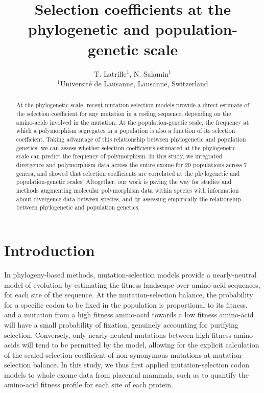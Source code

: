 \documentclass{article}
\title{Selection coefficients at the phylogenetic and population-genetic scale}
\author{
    \large
    T. {Latrille}$^{1}$, N. {Salamin}$^{1}$\\
    $^{1}$Université de Lausanne, Lausanne, Switzerland
}
\begin{document}
    \maketitle

    \begin{abstract}
        At the phylogenetic scale, recent mutation-selection models provide a direct estimate of the selection coefficient for any mutation in a coding sequence, depending on the amino-acids involved in the mutation.
        At the population-genetic scale, the frequency at which a polymorphism segregates in a population is also a function of its selection coefficient.
        Taking advantage of this relationship between phylogenetic and population genetics, we can assess whether selection coefficients estimated at the phylogenetic scale can predict the frequency of polymorphism.
        In this study, we integrated divergence and polymorphism data across the entire exome for 29 populations across 7 genera, and showed that selection coefficients are correlated at the phylogenetic and population-genetic scales.
        Altogether, our work is paving the way for studies and methods augmenting molecular polymorphism data within species with information about divergence data between species, and by assessing empirically the relationship between phylogenetic and population genetics.
    \end{abstract}


    \tableofcontents

    \section{Introduction}\label{sec:introduction}

    In phylogeny-based methods, mutation-selection models provide a nearly-neutral model of evolution by estimating the fitness landscape over amino-acid sequences, for each site of the sequence\cite{yang_mutationselection_2008, halpern_evolutionary_1998, rodrigue_mechanistic_2010}.
    At the mutation-selection balance, the probability for a specific codon to be fixed in the population is proportional to its fitness, and a mutation from a high fitness amino-acid towards a low fitness amino-acid will have a small probability of fixation, genuinely accounting for purifying selection.
    Conversely, only nearly-neutral mutations between high fitness amino acids will tend to be permitted by the model, allowing for the explicit calculation of the scaled selection coefficient of non-synonymous mutations at mutation-selection balance\cite{spielman_relationship_2015, rodrigue_detecting_2017}.
    In this study, we thus first applied mutation-selection codon models to whole exome data from placental mammals, such as to quantify the amino-acid fitness profile for each site of each protein.
\end{document}
